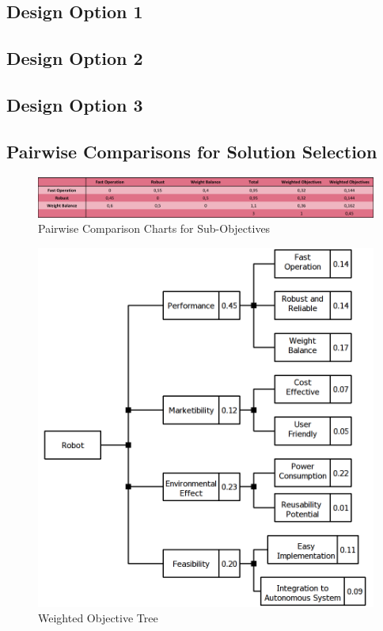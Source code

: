 \documentclass[a4paper,12pt]{article}
\begin{document}
		
	\subsection{Design Option 1}
	
	\subsection{Design Option 2}
	
	\subsection{Design Option 3}
	
	
	\subsection{Pairwise Comparisons for Solution Selection}	
	
	\begin{figure}[H]
		\centering
		\includegraphics[width=\textwidth,height=\textheight,keepaspectratio]{images/proje_objective_tree_2} 
		\caption{\label{fig:sub_project_objective_tree}Pairwise Comparison Charts for Sub-Objectives}
	\end{figure}	
	
	\begin{figure}[H]
		\centering
		\includegraphics[width=\textwidth,height=\textheight,keepaspectratio]{objective-tree/objective-tree} 
		\caption{\label{fig:product_tree}Weighted Objective Tree}
	\end{figure}
	
\end{document}
